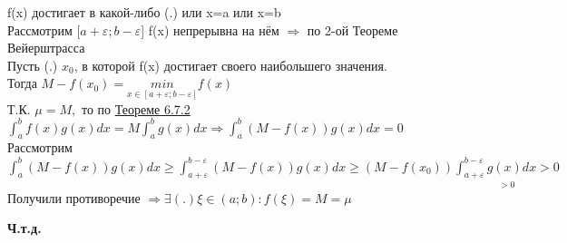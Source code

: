\documentclass[12pt]{article}
\begin{document}
\begin{enumerate}
\begin{adjustwidth}{1.5em}{1.5em}
\begin{enumerate}
                f(x) достигает в какой-либо (.) или x=a или x=b\\
                Рассмотрим [$a+\varepsilon;b-\varepsilon$] f(x) непрерывна на нём $\Rightarrow$ по 2-ой Теореме Вейерштрасса\\
                Пусть (.) $x_0$, в которой f(x) достигает своего наибольшего значения.\\
                Тогда $M-f(x_0)=\underset{x \in [a+\varepsilon;b-\varepsilon]}{min}f(x)$\\
                Т.К. $\mu=M,$ то по \hyperref[th:6.7.2]{Теореме 6.7.2} $\int_{a}^{b} f(x)g(x)dx=M\int_{a}^{b}g(x)dx \Rightarrow \int_{a}^{b}
                (M-f(x))g(x)dx=0$\\
                Рассмотрим $\int_{a}^{b}(M-f(x))g(x)dx\geq\int_{a+\varepsilon}^{b-\varepsilon}(M-f(x))g(x)dx \geq (M-f(x_0)) \underset{>0}{\int_{a+\varepsilon}^{b-\varepsilon} g(x)dx>0}$ Получили противоречие
                $\Rightarrow \exists (.) \xi \in (a;b): f(\xi)=M=\mu$\\
                \begin{center}
                    \textbf{Ч.т.д.}
                \end{center}
            \end{enumerate}
        \end{adjustwidth}

\end{enumerate}
\end{document}
